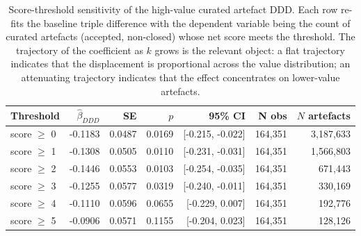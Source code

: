 \begin{table}[ht]
\centering
\caption{Score-threshold sensitivity of the high-value curated artefact DDD. Each row re-fits the baseline triple difference with the dependent variable being the count of curated artefacts (accepted, non-closed) whose net score meets the threshold. The trajectory of the coefficient as $k$ grows is the relevant object: a flat trajectory indicates that the displacement is proportional across the value distribution; an attenuating trajectory indicates that the effect concentrates on lower-value artefacts.}
\label{tab:score_threshold_sensitivity}
\small
\begin{tabular}{lrrrrrr}
\toprule
Threshold & $\hat\beta_{DDD}$ & SE & $p$ & 95\% CI & N obs & $N$ artefacts \\
\midrule
score $\geq$ 0 & -0.1183 & 0.0487 & 0.0169 & [-0.215, -0.022] & 164,351 & 3,187,633 \\
score $\geq$ 1 & -0.1308 & 0.0505 & 0.0110 & [-0.231, -0.031] & 164,351 & 1,566,803 \\
score $\geq$ 2 & -0.1446 & 0.0553 & 0.0103 & [-0.254, -0.035] & 164,351 & 671,443 \\
score $\geq$ 3 & -0.1255 & 0.0577 & 0.0319 & [-0.240, -0.011] & 164,351 & 330,169 \\
score $\geq$ 4 & -0.1110 & 0.0596 & 0.0655 & [-0.229, 0.007] & 164,351 & 192,776 \\
score $\geq$ 5 & -0.0906 & 0.0571 & 0.1155 & [-0.204, 0.023] & 164,351 & 128,126 \\
\bottomrule
\end{tabular}
\end{table}